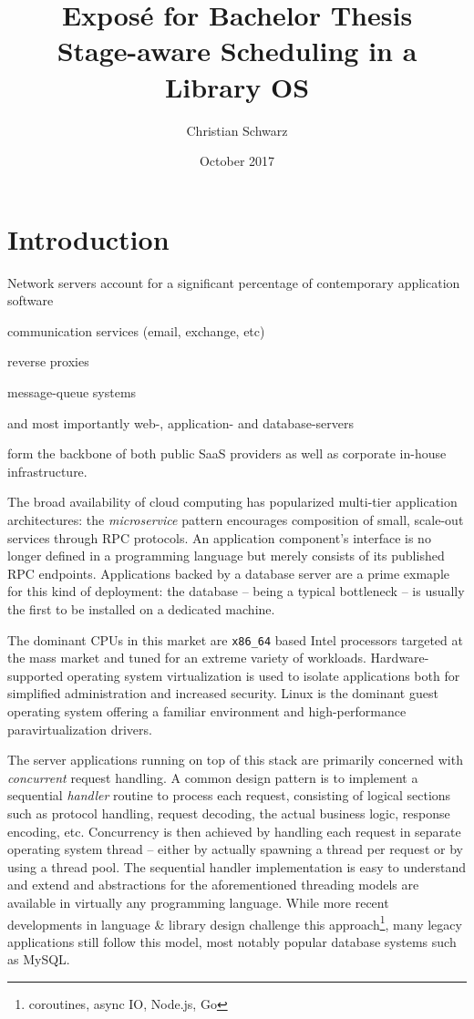 \documentclass{article}
\title{{\large Exposé for Bachelor Thesis}\\Stage-aware Scheduling in a Library OS}
\author{Christian Schwarz}
\date{October 2017}
\begin{document}
\maketitle

\section{Introduction}

Network servers account for a significant percentage of contemporary application software%
\begin{itemize*}[label={}, before={{:}}, itemjoin={{,}}]
    \item communication services (email, exchange, etc)
    \item reverse proxies
    \item message-queue systems
    \item and most importantly web-, application- and database-servers
\end{itemize*}
form the backbone of both public SaaS providers as well as corporate in-house infrastructure. 

The broad availability of cloud computing has popularized multi-tier application architectures:
the \textit{microservice} pattern encourages composition of small, scale-out services through RPC protocols.
An application component's interface is no longer defined in a programming language but merely consists of its published
RPC endpoints.
Applications backed by a database server are a prime exmaple for this kind of deployment:
the database -- being a typical bottleneck -- is usually the first to be installed on a dedicated machine.

The dominant CPUs in this market are \texttt{x86\_64} based Intel processors targeted at the mass market and tuned for an
extreme variety of workloads.
Hardware-supported operating system virtualization is used to isolate applications both for simplified administration
and increased security.
Linux is the dominant guest operating system offering a familiar environment and high-performance paravirtualization drivers.

The server applications running on top of this stack are primarily concerned with \emph{concurrent} request handling.
A common design pattern is to implement a sequential \textit{handler} routine to process each request, consisting of
logical sections such as protocol handling, request decoding, the actual business logic, response encoding, etc.
Concurrency is then achieved by handling each request in separate operating system thread -- either
by actually spawning a thread per request or by using a thread pool.
The sequential handler implementation is easy to understand and extend and
abstractions for the aforementioned threading models are available in virtually any programming language.
While more recent developments in language \& library design challenge this approach\footnote{coroutines, async IO, Node.js, Go},
many legacy applications still follow this model, most notably popular database systems such as MySQL.
\end{document}
